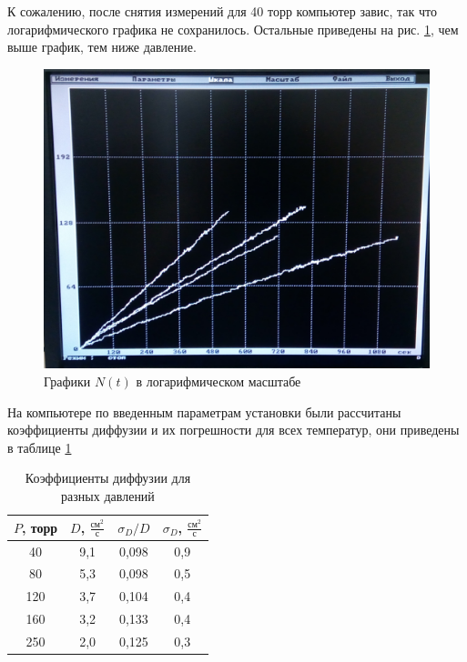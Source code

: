 \documentclass[12pt]{article}
\newcommand{\fref}[1]{рис. \ref{#1}}
\begin{document}
	К сожалению, после снятия измерений для 40 торр компьютер завис, так что логарифмического графика не сохранилось. Остальные приведены на \fref{graphs-log}, чем выше график, тем ниже давление.
	
	\begin{figure}[!h]
		\caption{Графики $N(t)$ в логарифмическом масштабе}
		\begin{center}
		\includegraphics[scale=0.1]{graph-all-log.jpg}
		\end{center}
		\label{graphs-log}
	\end{figure}
	
	На компьютере по введенным параметрам установки были рассчитаны коэффициенты диффузии и их погрешности для всех температур, они приведены в таблице \ref{tb:diffusion_co}
	
	\begin{table}[!h]
		\caption{Коэффициенты диффузии для разных давлений}
		\label{tb:diffusion_co}
		\begin{center}
			\begin{tabular}{|c|c|c|c|}
				\hline
				$P$, торр & $D$, $\frac{\text{см}^2}{\text{с}}$ & $\sigma_D/D$ & $\sigma_D$, $\frac{\text{см}^2}{\text{с}}$ \\
				\hline
				40 & 9,1 & 0,098 & 0,9 \\
				80 & 5,3 & 0,098 & 0,5 \\
				120 & 3,7 & 0,104 & 0,4 \\
				160 & 3,2 & 0,133 & 0,4 \\
				250 & 2,0 & 0,125 & 0,3 \\
				\hline
			\end{tabular}
		\end{center}
	\end{table}
	
\end{document}
